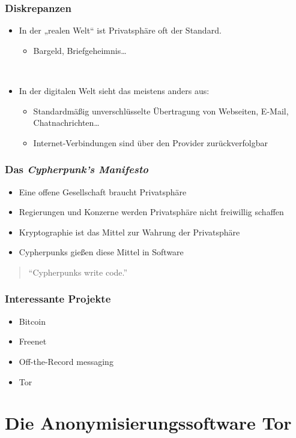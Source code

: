 \documentclass{beamer}
\begin{document}
\begin{frame}
\frametitle{Diskrepanzen}

	\begin{itemize}
		\item In der „realen Welt“ ist Privatsphäre oft der Standard.
		\begin{itemize}
			\item Bargeld, Briefgeheimnis…
		\end{itemize}
	
		\ \\
	
		\item In der digitalen Welt sieht das meistens anders aus:
		\begin{itemize}
			\item Standardmäßig unverschlüsselte Übertragung von Webseiten, E-Mail, Chatnachrichten\dots
			\item Internet-Verbindungen sind über den Provider zurückverfolgbar
		\end{itemize}
	\end{itemize}
\end{frame}

\begin{frame}
\frametitle{Das \textit{Cypherpunk’s Manifesto}}

	\begin{itemize}
		\item Eine offene Gesellschaft braucht Privatsphäre
		\item Regierungen und Konzerne werden Privatsphäre nicht freiwillig schaffen
		\item Kryptographie ist das Mittel zur Wahrung der Privatsphäre
		\item Cypherpunks gießen diese Mittel in Software
	\end{itemize}

	\begin{quote}
		“Cypherpunks write code.”
	\end{quote}
\end{frame}

\begin{frame}
\frametitle{Interessante Projekte}

	\begin{itemize}
		\item Bitcoin
		\item Freenet
		\item Off-the-Record messaging
		\item Tor
	\end{itemize}
\end{frame}

\section{Die Anonymisierungssoftware Tor}

\begin{frame}

\end{frame}
\end{document}
